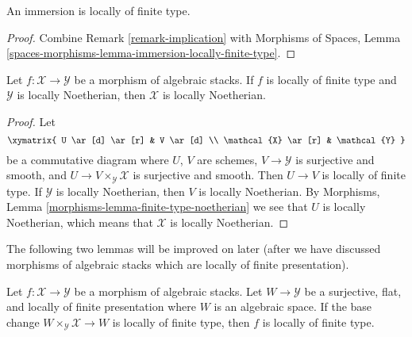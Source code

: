 \begin{lemma}
\label{lemma-immersion-locally-finite-type}
An immersion is locally of finite type.
\end{lemma}

\begin{proof}
Combine Remark \ref{remark-implication} with
Morphisms of Spaces,
Lemma \ref{spaces-morphisms-lemma-immersion-locally-finite-type}.
\end{proof}

\begin{lemma}
\label{lemma-locally-finite-type-locally-noetherian}
Let $f : \mathcal{X} \to \mathcal{Y}$ be a morphism of algebraic stacks.
If $f$ is locally of finite type and $\mathcal{Y}$ is locally Noetherian,
then $\mathcal{X}$ is locally Noetherian.
\end{lemma}

\begin{proof}
Let
$$
\xymatrix{
U \ar[d] \ar[r] & V \ar[d] \\
\mathcal{X} \ar[r] & \mathcal{Y}
}
$$
be a commutative diagram where $U$, $V$ are schemes,
$V \to \mathcal{Y}$ is surjective and smooth, and
$U \to V \times_\mathcal{Y} \mathcal{X}$ is surjective and smooth.
Then $U \to V$ is locally of finite type. If $\mathcal{Y}$ is
locally Noetherian, then $V$ is locally Noetherian. By
Morphisms, Lemma \ref{morphisms-lemma-finite-type-noetherian}
we see that $U$ is locally Noetherian, which means that $\mathcal{X}$
is locally Noetherian.
\end{proof}

\noindent
The following two lemmas will be improved on later (after we have discussed
morphisms of algebraic stacks which are locally of finite presentation).

\begin{lemma}
\label{lemma-check-finite-type-covering}
Let $f : \mathcal{X} \to \mathcal{Y}$ be a morphism of algebraic stacks.
Let $W \to \mathcal{Y}$ be a surjective, flat, and locally of finite
presentation where $W$ is an algebraic space. If the base change
$W \times_\mathcal{Y} \mathcal{X} \to W$ is
locally of finite type, then $f$ is locally of finite type.
\end{lemma}

